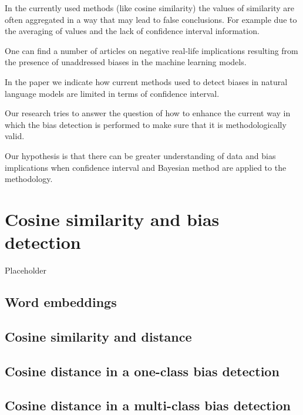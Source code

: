 \documentclass[
  12pt,
]{book}
\begin{document}
In the currently used methods (like cosine similarity) the values of similarity are often aggregated in a way that may lead to false conclusions. For
example due to the averaging of values and the lack of confidence interval information.

One can find a number of articles on negative real-life implications resulting from the presence of unaddressed biases in the machine learning models.

In the paper we indicate how current methods used to detect biases in natural language models are limited in terms of confidence interval.

Our research tries to answer the question of how to enhance the current way in which the bias detection is performed to make sure that it is
methodologically valid.

Our hypothesis is that there can be greater understanding of data and bias implications when confidence interval and Bayesian method are applied to the
methodology.

\hypertarget{cosine-similarity-and-bias-detection}{%
\chapter{Cosine similarity and bias detection}\label{cosine-similarity-and-bias-detection}}

Placeholder

\hypertarget{word-embeddings}{%
\section{Word embeddings}\label{word-embeddings}}

\hypertarget{cosine-similarity-and-distance}{%
\section{Cosine similarity and distance}\label{cosine-similarity-and-distance}}

\hypertarget{cosine-distance-in-a-one-class-bias-detection}{%
\section{Cosine distance in a one-class bias detection}\label{cosine-distance-in-a-one-class-bias-detection}}

\hypertarget{cosine-distance-in-a-multi-class-bias-detection}{%
\section{Cosine distance in a multi-class bias detection}\label{cosine-distance-in-a-multi-class-bias-detection}}
\end{document}
